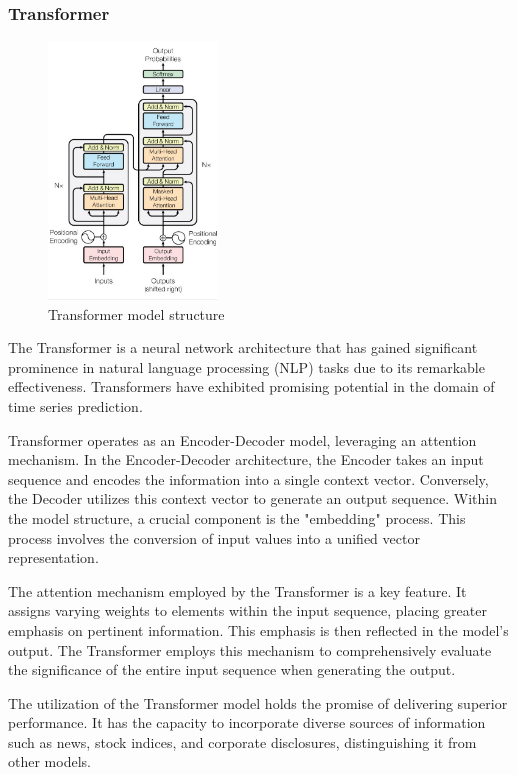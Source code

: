 \subsubsection{Transformer}

\begin{figure}
	\includegraphics[width=0.4\textwidth]{Fig/Transformer.jpg}
	\caption{Transformer model structure}
\end{figure}
The Transformer is a neural network architecture that has gained significant prominence in natural language processing (NLP) tasks 
due to its remarkable effectiveness. Transformers have exhibited promising potential in the domain of time series prediction.

Transformer operates as an Encoder-Decoder model, leveraging an attention mechanism.
In the Encoder-Decoder architecture, the Encoder takes an input sequence and encodes the information into a single context vector. 
Conversely, the Decoder utilizes this context vector to generate an output sequence.
Within the model structure, a crucial component is the "embedding" process. 
This process involves the conversion of input values into a unified vector representation.

The attention mechanism employed by the Transformer is a key feature. 
It assigns varying weights to elements within the input sequence, placing greater emphasis on pertinent information. 
This emphasis is then reflected in the model's output. 
The Transformer employs this mechanism to comprehensively evaluate the significance of the entire input sequence when generating the output.

The utilization of the Transformer model holds the promise of delivering superior performance. 
It has the capacity to incorporate diverse sources of information such as news, stock indices, and corporate disclosures, distinguishing it from other models.

